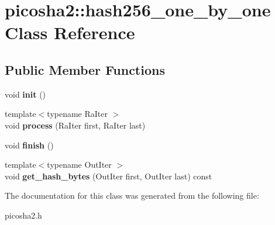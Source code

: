 \hypertarget{classpicosha2_1_1hash256__one__by__one}{}\section{picosha2\+:\+:hash256\+\_\+one\+\_\+by\+\_\+one Class Reference}
\label{classpicosha2_1_1hash256__one__by__one}
\subsection*{Public Member Functions}
\begin{DoxyCompactItemize}
\item 
\mbox{\label{classpicosha2_1_1hash256__one__by__one_a9308a2f22f9d0afbd315c9cf45458819}} 
void {\bfseries init} ()
\item 
\mbox{\label{classpicosha2_1_1hash256__one__by__one_a2ce5fc541a7c27a935eecb85b9dd6497}} 
{\footnotesize template$<$typename Ra\+Iter $>$ }\\void {\bfseries process} (Ra\+Iter first, Ra\+Iter last)
\item 
\mbox{\label{classpicosha2_1_1hash256__one__by__one_a1c2c4d24deccb590cbbd30ffeb317690}} 
void {\bfseries finish} ()
\item 
\mbox{\label{classpicosha2_1_1hash256__one__by__one_a3f9ac7afd9396f70f779cf7f99bfa4d9}} 
{\footnotesize template$<$typename Out\+Iter $>$ }\\void {\bfseries get\+\_\+hash\+\_\+bytes} (Out\+Iter first, Out\+Iter last) const
\end{DoxyCompactItemize}


The documentation for this class was generated from the following file\+:\begin{DoxyCompactItemize}
\item 
picosha2.\+h\end{DoxyCompactItemize}
